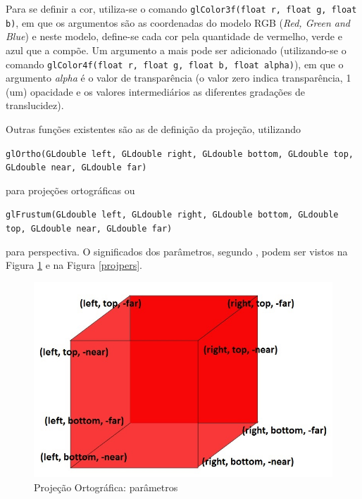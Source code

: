 	Para se definir a cor, utiliza-se o  comando \texttt{glColor3f(float r, float g, float b)}, em que os argumentos são as coordenadas do modelo RGB (\textit{Red, Green and Blue}) e neste modelo, define-se cada cor pela quantidade de vermelho, verde e azul que a compõe. Um argumento a mais pode ser adicionado (utilizando-se o comando \texttt{glColor4f(float r, float g, float b, float alpha)}), em que o argumento \textit{alpha} é o valor de transparência (o valor zero indica transparência, 1 (um)  opacidade e os valores intermediários as diferentes gradações de translucidez).  

	Outras funções existentes são as de definição da projeção, utilizando 
	
	\begin{center}
	\texttt{glOrtho(GLdouble left, GLdouble right, GLdouble bottom, GLdouble top, GLdouble near, GLdouble far)}
	\end{center}

	 para projeções ortográficas ou 

	\begin{center}
	\texttt{glFrustum(GLdouble left, GLdouble right, GLdouble bottom, GLdouble top, GLdouble near, GLdouble far)} 
	\end{center}

	para perspectiva. O significados dos parâmetros, segundo \cite{guha2011}, podem ser vistos na  Figura \ref{projorto} e na Figura \ref{projpers}.

 	\begin{figure}[h]
	\centering
		\includegraphics[keepaspectratio=true,scale=0.6]{figuras/projorto.jpg}
	\caption{Projeção Ortográfica: parâmetros}
	\label{projorto}
	\end{figure}

